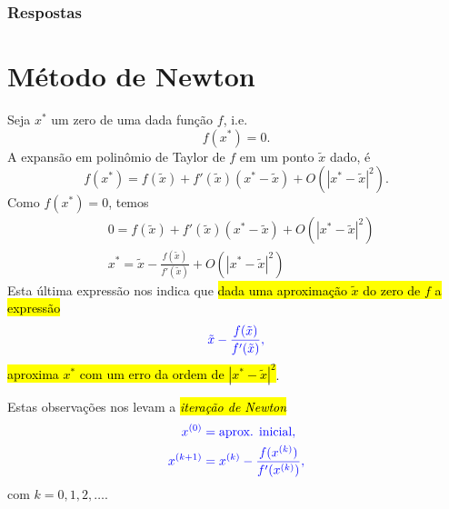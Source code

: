 \ifisbook
\subsubsection{Respostas}
\shipoutAnswer
\fi


\section{Método de Newton}\label{cap_eq1d_sec_newton}

Seja $x^*$ um zero de uma dada função $f$, i.e.
\begin{equation}
  f(x^*)=0.
\end{equation}
A expansão em polinômio de Taylor{\taylor} de $f$ em um ponto $\tilde{x}$ dado, é
\begin{equation}
  f(x^*) = f(\tilde{x}) + f'(\tilde{x})(x^*-\tilde{x}) + O\left(\left|x^*-\tilde{x}\right|^2\right).
\end{equation}
Como $f(x^*)=0$, temos
\begin{align}
  & 0 = f(\tilde{x}) + f'(\tilde{x})(x^*-\tilde{x}) + O\left(\left|x^*-\tilde{x}\right|^2\right)\\
  & x^* = \tilde{x} - \frac{f(\tilde{x})}{f'(\tilde{x})} + O\left(\left|x^*-\tilde{x}\right|^2\right)
\end{align}
Esta última expressão nos indica que \hl{dada uma aproximação $\tilde{x}$ do zero de $f$ a expressão}
\begin{equation}
  \color{blue}\tilde{x} - \frac{f(\tilde{x})}{f'(\tilde{x})},
\end{equation}
\hl{aproxima $x^*$ com um erro da ordem de $|x^*-\tilde{x}|^2$}.

Estas observações nos levam a \hl{\emph{iteração de Newton}}
\begin{align}
  \color{blue}x^{(0)} &\color{blue}= \text{aprox. inicial},\\
  \color{blue}x^{(k+1)} &\color{blue}= x^{(k)} - \frac{f(x^{(k)})}{f'(x^{(k)})},\label{cap_eq1d_sec_newton:eq:Newton_iteracao}
\end{align}
com $k=0, 1, 2, \ldots$.

